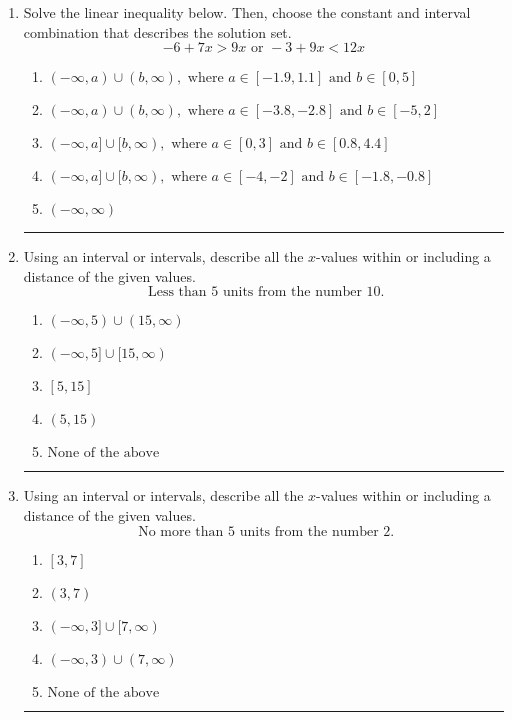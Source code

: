 \documentclass[14pt]{extbook}
\newcommand{\litem}[1]{\item#1\hspace*{-1cm}\rule{\textwidth}{0.4pt}}
\begin{document}
\begin{enumerate}
\litem{
Solve the linear inequality below. Then, choose the constant and interval combination that describes the solution set.\[ -6 + 7 x > 9 x \text{ or } -3 + 9 x < 12 x \]\begin{enumerate}[label=\Alph*.]
\item \( (-\infty, a) \cup (b, \infty), \text{ where } a \in [-1.9, 1.1] \text{ and } b \in [0, 5] \)
\item \( (-\infty, a) \cup (b, \infty), \text{ where } a \in [-3.8, -2.8] \text{ and } b \in [-5, 2] \)
\item \( (-\infty, a] \cup [b, \infty), \text{ where } a \in [0, 3] \text{ and } b \in [0.8, 4.4] \)
\item \( (-\infty, a] \cup [b, \infty), \text{ where } a \in [-4, -2] \text{ and } b \in [-1.8, -0.8] \)
\item \( (-\infty, \infty) \)

\end{enumerate} }
\litem{
Using an interval or intervals, describe all the $x$-values within or including a distance of the given values.\[ \text{ Less than } 5 \text{ units from the number } 10. \]\begin{enumerate}[label=\Alph*.]
\item \( (-\infty, 5) \cup (15, \infty) \)
\item \( (-\infty, 5] \cup [15, \infty) \)
\item \( [5, 15] \)
\item \( (5, 15) \)
\item \( \text{None of the above} \)

\end{enumerate} }
\litem{
Using an interval or intervals, describe all the $x$-values within or including a distance of the given values.\[ \text{ No more than } 5 \text{ units from the number } 2. \]\begin{enumerate}[label=\Alph*.]
\item \( [3, 7] \)
\item \( (3, 7) \)
\item \( (-\infty, 3] \cup [7, \infty) \)
\item \( (-\infty, 3) \cup (7, \infty) \)
\item \( \text{None of the above} \)


\end{enumerate}}
\end{enumerate}
\end{document}
